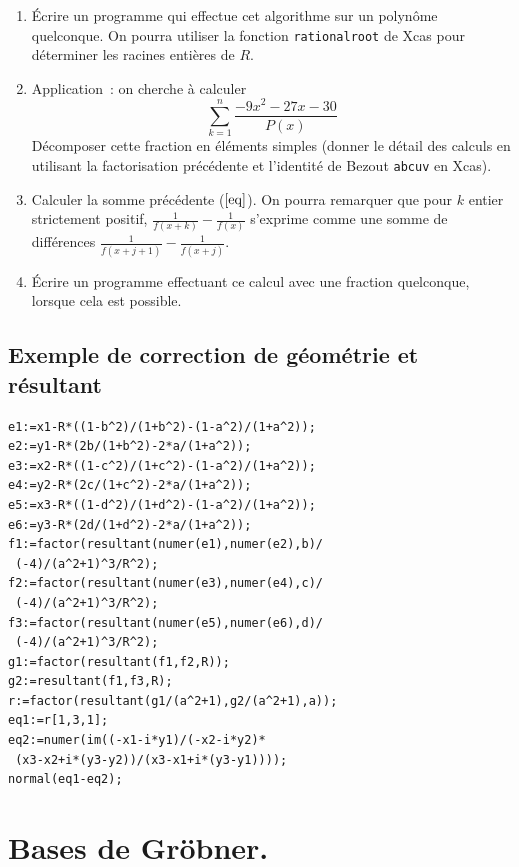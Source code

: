 \documentclass[a4paper,11pt]{book}
\begin{document}
\begin{giacjshere}
\begin{enumerate}
\[P(x)=x^6+9x^5+29x^4+41x^3+37 x^2+59x+31\]
Montrer que $P$ a la propriété $\mathcal{I}$. Calculer
la ou les racines entières de $R$ et donner la factorisation
correspondante de $P$. 
\item \'Ecrire un programme qui effectue cet algorithme sur un
polyn\^ome quelconque. On pourra utiliser la fonction 
\verb|rationalroot| de Xcas pour d\'eterminer les racines
enti\`eres de $R$.
\item Application~: on cherche \`a calculer
\begin{equation} \label{eq}
 \sum_{k=1}^n \frac{-9x^2-27x-30}{P(x)}
\end{equation}
D\'ecomposer cette fraction
en \'el\'ements simples (donner le d\'etail des calculs en utilisant
la factorisation pr\'ec\'edente et l'identit\'e de Bezout 
\verb|abcuv| en Xcas). 
\item Calculer la somme pr\'ec\'edente (\(\ref{eq}\)).
On pourra remarquer que pour $k$ entier strictement positif,
$\frac{1}{f(x+k)}-\frac{1}{f(x)}$
s'exprime comme une somme de diff\'erences  
$\frac{1}{f(x+j+1)}-\frac{1}{f(x+j)}$.
\item \'Ecrire un programme effectuant ce calcul avec une fraction
quelconque, lorsque cela est possible.
\end{enumerate}

\pagebreak

\section{Exemple de correction de g\'eom\'etrie et r\'esultant}
\begin{verbatim}
e1:=x1-R*((1-b^2)/(1+b^2)-(1-a^2)/(1+a^2));
e2:=y1-R*(2b/(1+b^2)-2*a/(1+a^2));
e3:=x2-R*((1-c^2)/(1+c^2)-(1-a^2)/(1+a^2));
e4:=y2-R*(2c/(1+c^2)-2*a/(1+a^2));
e5:=x3-R*((1-d^2)/(1+d^2)-(1-a^2)/(1+a^2));
e6:=y3-R*(2d/(1+d^2)-2*a/(1+a^2));
f1:=factor(resultant(numer(e1),numer(e2),b)/
 (-4)/(a^2+1)^3/R^2);
f2:=factor(resultant(numer(e3),numer(e4),c)/
 (-4)/(a^2+1)^3/R^2);
f3:=factor(resultant(numer(e5),numer(e6),d)/
 (-4)/(a^2+1)^3/R^2);
g1:=factor(resultant(f1,f2,R));
g2:=resultant(f1,f3,R);
r:=factor(resultant(g1/(a^2+1),g2/(a^2+1),a));
eq1:=r[1,3,1];
eq2:=numer(im((-x1-i*y1)/(-x2-i*y2)*
 (x3-x2+i*(y3-y2))/(x3-x1+i*(y3-y1))));
normal(eq1-eq2);
\end{verbatim}

\chapter{Bases de Gr\"obner.} \label{sec:groebner}  

\end{giacjshere}
\end{document}
